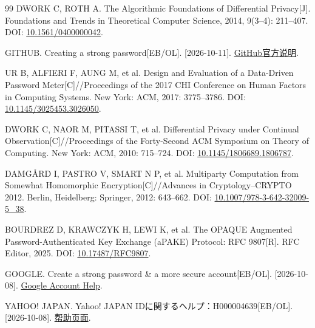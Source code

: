 \documentclass{crypto_report}
\renewcommand{\thesubsection}{\arabic{section}.\arabic{subsection}}
\renewcommand{\thesubsubsection}{\arabic{section}.\arabic{subsection}.\arabic{subsubsection}}
\begin{document}
\begin{thebibliography}{99}
 DWORK C, ROTH A. The Algorithmic Foundations of Differential Privacy{[}J{]}. Foundations and Trends in Theoretical Computer Science, 2014, 9(3--4): 211--407. DOI:
\href{https://doi.org/10.1561/0400000042}{10.1561/0400000042}.

 GITHUB. Creating a strong password[EB/OL]. [2026-10-11].
\href{https://docs.github.com/en/authentication/keeping-your-account-and-data-secure/creating-a-strong-password}{GitHub官方说明}.


 UR B, ALFIERI F, AUNG M, et al. Design and Evaluation of a Data-Driven Password Meter[C]//Proceedings of the 2017 CHI Conference on Human Factors in Computing Systems. New York: ACM, 2017: 3775--3786. DOI: \href{https://doi.org/10.1145/3025453.3026050}{10.1145/3025453.3026050}.

 DWORK C, NAOR M, PITASSI T, et al. Differential Privacy under Continual Observation[C]//Proceedings of the Forty-Second ACM Symposium on Theory of Computing. New York: ACM, 2010: 715--724. DOI: \href{https://doi.org/10.1145/1806689.1806787}{10.1145/1806689.1806787}.

 DAMGÅRD I, PASTRO V, SMART N P, et al. Multiparty Computation from Somewhat Homomorphic Encryption[C]//Advances in Cryptology--CRYPTO 2012. Berlin, Heidelberg: Springer, 2012: 643--662. DOI: \href{https://doi.org/10.1007/978-3-642-32009-5_38}{10.1007/978-3-642-32009-5\_38}.

 BOURDREZ D, KRAWCZYK H, LEWI K, et al. The OPAQUE Augmented Password-Authenticated Key Exchange (aPAKE) Protocol: RFC 9807[R]. RFC Editor, 2025. DOI: \href{https://doi.org/10.17487/RFC9807}{10.17487/RFC9807}.

 GOOGLE. Create a strong password \& a more secure
account{[}EB/OL{]}. {[}2026-10-08{]}.
\href{https://support.google.com/accounts/answer/32040}{Google Account
Help}.

 YAHOO! JAPAN. Yahoo! JAPAN
IDに{\reportjapanese 関}するヘルプ：H000004639{[}EB/OL{]}. {[}2026-10-08{]}.
\href{https://support.yahoo-net.jp/SccLogin/s/article/H000004639}{帮助页面}.

\end{thebibliography}

\appendix
\renewcommand{\thetable}{\Alph{section}-\arabic{table}}
\renewcommand{\thesubsection}{\Alph{section}.\arabic{subsection}}
\renewcommand{\thesubsubsection}{\Alph{section}.\arabic{subsection}.\arabic{subsubsection}}
\clearpage
\end{document}
